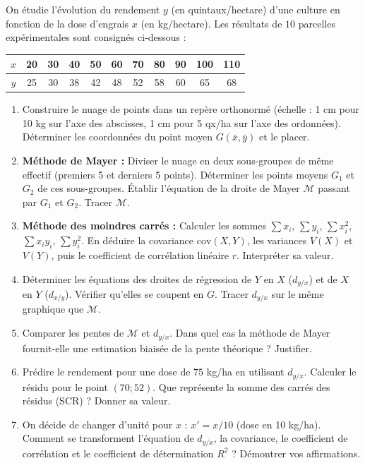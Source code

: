 \documentclass[11pt]{article}
\begin{document}
\begin{exercice}
On étudie l'évolution du rendement $y$ (en quintaux/hectare) d'une culture en fonction de la dose d'engrais $x$ (en kg/hectare). Les résultats de $10$ parcelles expérimentales sont consignés ci-dessous :
\begin{center}
\begin{tabular}{|c|c|c|c|c|c|c|c|c|c|c|}
\hline
$x$ & 20 & 30 & 40 & 50 & 60 & 70 & 80 & 90 & 100 & 110 \\
\hline
$y$ & 25 & 30 & 38 & 42 & 48 & 52 & 58 & 60 & 65 & 68 \\
\hline
\end{tabular}
\end{center}
\begin{enumerate}
    \item Construire le nuage de points dans un repère orthonormé (échelle : 1 cm pour 10 kg sur l'axe des abscisses, 1 cm pour 5 qx/ha sur l'axe des ordonnées). Déterminer les coordonnées du point moyen $G(\bar{x}, \bar{y})$ et le placer.
    \item \textbf{Méthode de Mayer :} Diviser le nuage en deux sous-groupes de même effectif (premiers 5 et derniers 5 points). Déterminer les points moyens $G_1$ et $G_2$ de ces sous-groupes. Établir l'équation de la droite de Mayer $\mathcal{M}$ passant par $G_1$ et $G_2$. Tracer $\mathcal{M}$.
    \item \textbf{Méthode des moindres carrés :} Calculer les sommes $\sum x_i$, $\sum y_i$, $\sum x_i^2$, $\sum x_i y_i$, $\sum y_i^2$. En déduire la covariance $\text{cov}(X,Y)$, les variances $V(X)$ et $V(Y)$, puis le coefficient de corrélation linéaire $r$. Interpréter sa valeur.
    \item Déterminer les équations des droites de régression de $Y$ en $X$ ($d_{y/x}$) et de $X$ en $Y$ ($d_{x/y}$). Vérifier qu'elles se coupent en $G$. Tracer $d_{y/x}$ sur le même graphique que $\mathcal{M}$.
    \item Comparer les pentes de $\mathcal{M}$ et $d_{y/x}$. Dans quel cas la méthode de Mayer fournit-elle une estimation biaisée de la pente théorique ? Justifier.
    \item Prédire le rendement pour une dose de $75$ kg/ha en utilisant $d_{y/x}$. Calculer le résidu pour le point $(70; 52)$. Que représente la somme des carrés des résidus (SCR) ? Donner sa valeur.
    \item On décide de changer d'unité pour $x$ : $x' = x/10$ (dose en 10 kg/ha). Comment se transforment l'équation de $d_{y/x}$, la covariance, le coefficient de corrélation et le coefficient de détermination $R^2$ ? Démontrer vos affirmations.
\end{enumerate}
\end{exercice}
\end{document}
